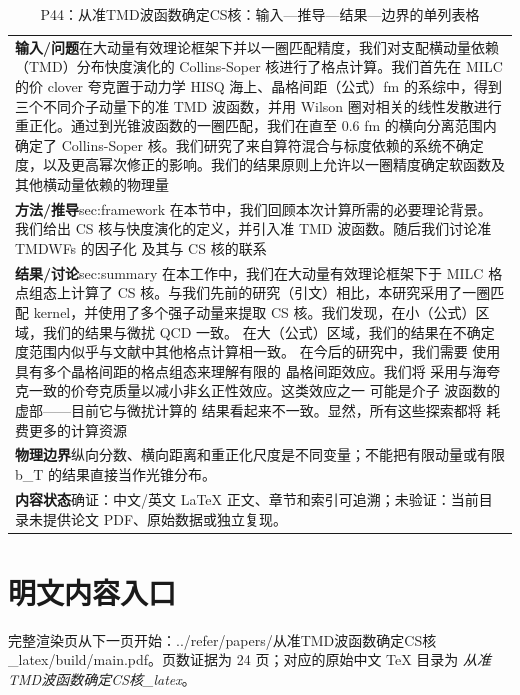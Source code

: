 \documentclass[UTF8,11pt,oneside]{ctexbook}
\begin{document}
\begin{table}[htbp]
  \centering
  \caption*{P44：从准TMD波函数确定CS核：输入—推导—结果—边界的单列表格}
  \small
  \begin{tabular}{@{}p{}@{}}
    \toprule
    \textbf{输入/问题}\quad 在大动量有效理论框架下并以一圈匹配精度，我们对支配横动量依赖（TMD）分布快度演化的 Collins-Soper 核进行了格点计算。我们首先在 MILC 的价 clover 夸克置于动力学 HISQ 海上、晶格间距（公式）fm 的系综中，得到三个不同介子动量下的准 TMD 波函数，并用 Wilson 圈对相关的线性发散进行重正化。通过到光锥波函数的一圈匹配，我们在直至 0.6 fm 的横向分离范围内确定了 Collins-Soper 核。我们研究了来自算符混合与标度依赖的系统不确定度，以及更高幂次修正的影响。我们的结果原则上允许以一圈精度确定软函数及其他横动量依赖的物理量 \\
    \textbf{方法/推导}\quad sec:framework 在本节中，我们回顾本次计算所需的必要理论背景。我们给出 CS 核与快度演化的定义，并引入准 TMD 波函数。随后我们讨论准 TMDWFs 的因子化 及其与 CS 核的联系 \\
    \textbf{结果/讨论}\quad sec:summary 在本工作中，我们在大动量有效理论框架下于 MILC 格点组态上计算了 CS 核。与我们先前的研究（引文）相比，本研究采用了一圈匹配 kernel，并使用了多个强子动量来提取 CS 核。我们发现，在小（公式）区域，我们的结果与微扰 QCD 一致。 在大（公式）区域，我们的结果在不确定度范围内似乎与文献中其他格点计算相一致。 在今后的研究中，我们需要 使用具有多个晶格间距的格点组态来理解有限的 晶格间距效应。我们将 采用与海夸克一致的价夸克质量以减小非幺正性效应。这类效应之一 可能是介子 波函数的虚部——目前它与微扰计算的 结果看起来不一致。显然，所有这些探索都将 耗费更多的计算资源 \\
    \textbf{物理边界}\quad 纵向分数、横向距离和重正化尺度是不同变量；不能把有限动量或有限 b\_T 的结果直接当作光锥分布。 \\
    \textbf{内容状态}\quad 确证：中文/英文 LaTeX 正文、章节和索引可追溯；未验证：当前目录未提供论文 PDF、原始数据或独立复现。 \\
    \bottomrule
  \end{tabular}
\end{table}
\section*{明文内容入口}
\noindent 完整渲染页从下一页开始：../\allowbreak{}refer/\allowbreak{}papers/\allowbreak{}从准TMD波函数确定CS核\_\allowbreak{}latex/\allowbreak{}build/\allowbreak{}main.pdf。页数证据为 24 页；对应的原始中文 TeX 目录为 \emph{从准TMD波函数确定CS核\_latex}。
\clearpage

\clearpage
\end{document}
